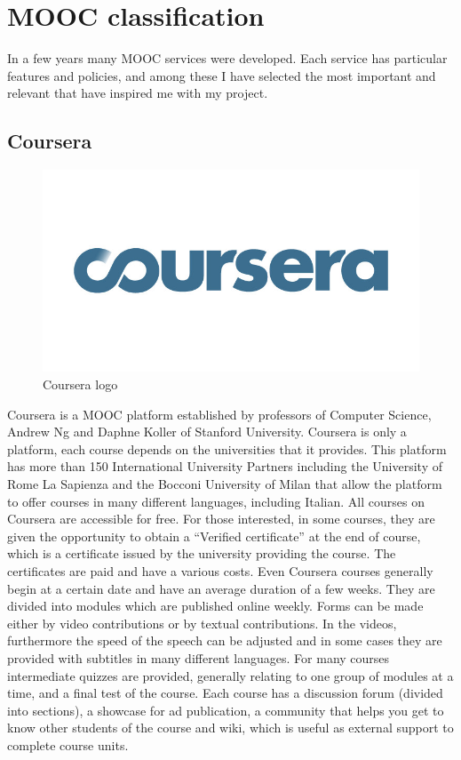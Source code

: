 \section{MOOC classification}
\label{sec:mooc_classification}

In a few years many MOOC services were developed. Each service has particular features and policies, and among these I have selected the most important and relevant that have inspired me with my project.

\subsection{Coursera}
\label{subsec:coursera}

\begin{figure}[htb] %
 \centering
 \includegraphics[width=0.5\linewidth]{images/chapter1/coursera.jpg}\hfill
 \caption[Coursera logo]{Coursera logo}
 \label{fig:fourV}
\end{figure}

Coursera is a MOOC platform established by professors of Computer Science, Andrew Ng and Daphne Koller of Stanford University. Coursera is only a platform, each course depends on the universities that it provides. This platform has more than 150 International University Partners including the University of Rome La Sapienza and the Bocconi University of Milan that allow the platform to offer courses in many different languages, including Italian. All courses on Coursera are accessible for free.
For those interested, in some courses, they are given the opportunity to obtain a “Verified certificate” at the end of course, which is a certificate issued by the university providing the course. The certificates are paid and have a various costs.
Even Coursera courses generally begin at a certain date and have an average duration of a few weeks. They are divided into modules which are published online weekly. Forms can be made either by video contributions or by textual contributions. In the videos, furthermore the speed of the speech can be adjusted and in some cases they are provided with subtitles in many different languages.
For many courses intermediate quizzes are provided, generally relating to one group of modules at a time, and a final test of the course.
Each course has a discussion forum (divided into sections), a showcase for ad publication, a community that helps you get to know other students of the course and wiki, which is useful as external support to complete course units.

